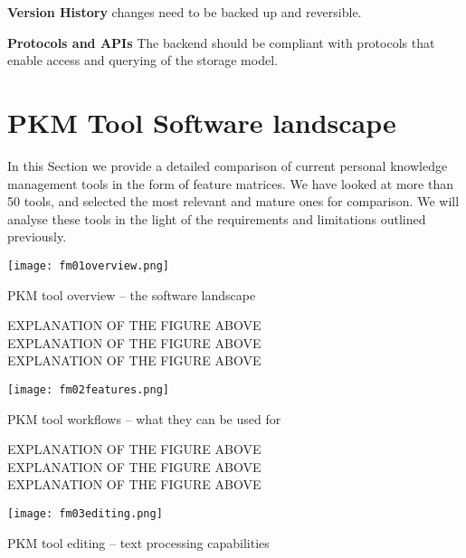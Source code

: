 \textbf{Version History} changes need to be backed up and reversible.

\textbf{Protocols and APIs} The backend should be compliant with protocols that enable access and querying of the storage model.







\section{PKM Tool Software landscape}

In this Section we provide a detailed comparison of current personal knowledge management tools in the form of feature matrices. We have looked at more than 50 tools, and selected the most relevant and mature ones for comparison. We will analyse these tools in the light of the requirements and limitations outlined previously.

\begin{table}[H]
    \centering
    \texttt{[image: fm01overview.png]}
    \caption{PKM tool overview -- the software landscape}
    \label{fig:fm01}
\end{table}

EXPLANATION OF THE FIGURE ABOVE \\
EXPLANATION OF THE FIGURE ABOVE \\
EXPLANATION OF THE FIGURE ABOVE \\


\begin{table}[H]
    \centering
    \texttt{[image: fm02features.png]}
    \caption{PKM tool workflows -- what they can be used for}
    \label{fig:fm02}
\end{table}

EXPLANATION OF THE FIGURE ABOVE \\
EXPLANATION OF THE FIGURE ABOVE \\
EXPLANATION OF THE FIGURE ABOVE \\


\begin{table}[H]
    \centering
    \texttt{[image: fm03editing.png]}
    \caption{PKM tool editing -- text processing capabilities}
    \label{fig:fm03}
\end{table}

